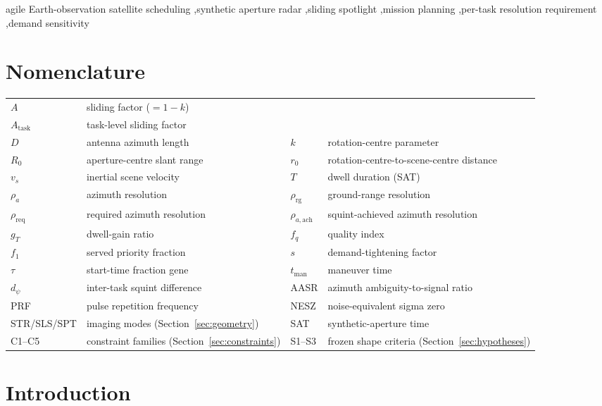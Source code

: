 \documentclass[preprint,authoryear]{elsarticle}
\begin{document}
\begin{frontmatter}
\begin{keyword}
agile Earth-observation satellite scheduling \sep synthetic aperture radar \sep sliding spotlight \sep mission planning \sep per-task resolution requirement \sep demand sensitivity
\end{keyword}

\end{frontmatter}

\section*{Nomenclature}
{\scriptsize\setlength{\tabcolsep}{3pt}%
\noindent\begin{tabular}{@{}ll@{\extracolsep{\fill}}ll@{}}
$A$ & sliding factor ($=1-k$) \\ $A_{\mathrm{task}}$ & task-level sliding factor \\
$D$ & antenna azimuth length & $k$ & rotation-centre parameter \\
$R_0$ & aperture-centre slant range & $r_0$ & rotation-centre-to-scene-centre distance \\
$v_s$ & inertial scene velocity & $T$ & dwell duration (SAT) \\
$\rho_a$ & azimuth resolution & $\rho_{\mathrm{rg}}$ & ground-range resolution \\
$\rho_{\mathrm{req}}$ & required azimuth resolution & $\rho_{a,\mathrm{ach}}$ & squint-achieved azimuth resolution \\
$g_T$ & dwell-gain ratio & $f_q$ & quality index \\
$f_1$ & served priority fraction & $s$ & demand-tightening factor \\
$\tau$ & start-time fraction gene & $t_{\mathrm{man}}$ & maneuver time \\
$d_\psi$ & inter-task squint difference & AASR & azimuth ambiguity-to-signal ratio \\
PRF & pulse repetition frequency & NESZ & noise-equivalent sigma zero \\
STR/SLS/SPT & imaging modes (Section~\ref{sec:geometry}) & SAT & synthetic-aperture time \\
C1--C5 & constraint families (Section~\ref{sec:constraints}) & S1--S3 & frozen shape criteria (Section~\ref{sec:hypotheses}) \\
\end{tabular}}
\vspace{0.6em}

\section{Introduction}
\end{document}
